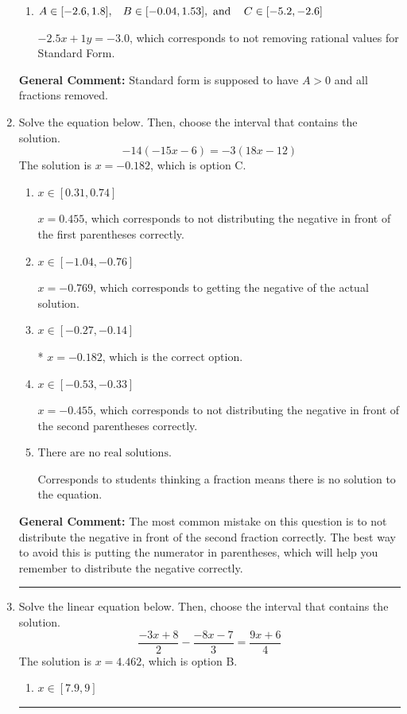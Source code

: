 \documentclass{extbook}[14pt]
\newcommand{\litem}[1]{\item #1

\rule{\textwidth}{0.4pt}}
\begin{document}
\begin{enumerate}
{\begin{enumerate}[label=\Alph*.]
 $-5x + 2y = -6$, which corresponds to not making $A$ positive (by multiplying the equation by $-1$).
\item \( A \in [-2.6, 1.8], \hspace{3mm} B \in [-0.04, 1.53], \text{ and } \hspace{3mm} C \in [-5.2, -2.6] \)

 $-2.5x + 1y = -3.0$, which corresponds to not removing rational values for Standard Form.
\end{enumerate}

\textbf{General Comment:} Standard form is supposed to have $A > 0$ and all fractions removed.
}
\litem{
Solve the equation below. Then, choose the interval that contains the solution.
\[ -14(-15x -6) = -3(18x -12) \]The solution is \( x = -0.182 \), which is option C.\begin{enumerate}[label=\Alph*.]
\item \( x \in [0.31, 0.74] \)

$x = 0.455$, which corresponds to not distributing the negative in front of the first parentheses correctly.
\item \( x \in [-1.04, -0.76] \)

$x = -0.769$, which corresponds to getting the negative of the actual solution.
\item \( x \in [-0.27, -0.14] \)

* $x = -0.182$, which is the correct option.
\item \( x \in [-0.53, -0.33] \)

$x = -0.455$, which corresponds to not distributing the negative in front of the second parentheses correctly.
\item \( \text{There are no real solutions.} \)

Corresponds to students thinking a fraction means there is no solution to the equation.
\end{enumerate}

\textbf{General Comment:} The most common mistake on this question is to not distribute the negative in front of the second fraction correctly. The best way to avoid this is putting the numerator in parentheses, which will help you remember to distribute the negative correctly.
}
\litem{
Solve the linear equation below. Then, choose the interval that contains the solution.
\[ \frac{-3x + 8}{2} - \frac{-8x -7}{3} = \frac{9x + 6}{4} \]The solution is \( x = 4.462 \), which is option B.\begin{enumerate}[label=\Alph*.]
\item \( x \in [7.9, 9] \)


\end{enumerate}}
\end{enumerate}
\end{document}
